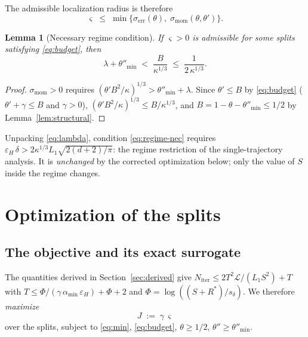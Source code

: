 \documentclass[11pt,a4paper]{article}
\theoremstyle{plain}
\newtheorem{lemma}{Lemma}
\theoremstyle{definition}
\newcommand{\eps}{\varepsilon}
\newcommand{\epsH}{\eps_{H}}
\newcommand{\sdel}{s_{\delta}}
\newcommand{\LL}{\mathcal{L}}
\newcommand{\Rstar}{R^{*}}
\newcommand{\Niter}{N_{\mathrm{iter}}}
\newcommand{\serr}{\sigma_{\mathrm{err}}}
\newcommand{\smom}{\sigma_{\mathrm{mom}}}
\newcommand{\thetamin}{\theta''_{\min}}
\newcommand{\amin}{\alpha_{\min}}
\begin{document}
The admissible localization radius is therefore
\begin{equation}\label{eq:min}
\boxed{\;\varsigma \;\le\; \min\big\{\serr(\theta),\;
\smom(\theta,\theta')\big\}.\;}
\end{equation}

\begin{lemma}[Necessary regime condition]\label{lem:regime-nec}
If $\varsigma > 0$ is admissible for some splits satisfying \eqref{eq:budget},
then
\begin{equation}\label{eq:regime-nec}
\lambda + \thetamin \;<\; \frac{B}{\kappa^{1/3}}
\;\le\; \frac{1}{2\,\kappa^{1/3}} .
\end{equation}
\end{lemma}

\begin{proof}
$\smom > 0$ requires $(\theta' B^2/\kappa)^{1/3} > \thetamin+\lambda$.
Since $\theta' \le B$ by \eqref{eq:budget} ($\theta'+\gamma \le B$ and
$\gamma>0$), $(\theta' B^2/\kappa)^{1/3} \le B/\kappa^{1/3}$, and
$B = 1-\theta-\thetamin \le 1/2$ by Lemma~\ref{lem:structural}.
\end{proof}

Unpacking \eqref{eq:lambda}, condition \eqref{eq:regime-nec} requires
$\epsH\,\delta > 2\kappa^{1/3}L_1\sqrt{2(d+2)/\pi}$: the regime restriction
of the single-trajectory analysis. It is \emph{unchanged} by the corrected
optimization below; only the value of $S$ inside the regime changes.

\section{Optimization of the splits}\label{sec:optimization}

\subsection{The objective and its exact surrogate}

The quantities derived in Section~\ref{sec:derived} give
$\Niter \le 2T^2\LL/(L_1 S^2) + T$ with
$T \le \Phi/(\gamma\,\amin\,\epsH) + \Phi + 2$ and
$\Phi = \log((S+\Rstar)/\sdel)$. We therefore \emph{maximize}
\begin{equation}\label{eq:objective}
J \;:=\; \gamma\,\varsigma
\end{equation}
over the splits, subject to \eqref{eq:min}, \eqref{eq:budget},
$\theta\ge 1/2$, $\theta'' \ge \thetamin$.
\end{document}
